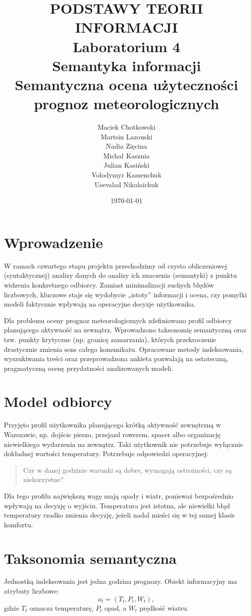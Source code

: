 \documentclass[a4paper,12pt]{article}
\title{
    \vspace{1.5cm}
    \textbf{PODSTAWY TEORII INFORMACJI}\\
    \vspace{1.5cm}
    Laboratorium 4\\
    Semantyka informacji\\
    \vspace{1.5cm}
    \huge \textbf{Semantyczna ocena użyteczności prognoz meteorologicznych}\\
    \vspace{1cm}
}
\author{
    Maciek Chotkowski \\ Martsin Lazouski \\ Nadia Zięcina \\
    Michał Kasznia \\ Julian Kasiński \\ Volodymyr Kamenchuk \\ Usevalad Nikalaichuk
}
\date{\today}
\begin{document}
\maketitle
\newpage

\tableofcontents
\newpage
\section{Wprowadzenie}

W ramach czwartego etapu projektu przechodzimy od czysto obliczeniowej (syntaktycznej) analizy danych do analizy ich znaczenia (semantyki) z punktu widzenia konkretnego odbiorcy. Zamiast minimalizacji suchych błędów liczbowych, kluczowe staje się wydobycie „istoty” informacji i ocena, czy pomyłki modeli faktycznie wpływają na operacyjne decyzje użytkownika.

Dla problemu oceny prognoz meteorologicznych zdefiniowano profil odbiorcy planującego aktywność na zewnątrz. Wprowadzono taksonomię semantyczną oraz tzw. punkty krytyczne (np. granicę zamarzania), których przekroczenie drastycznie zmienia sens całego komunikatu. Opracowane metody indeksowania, wyszukiwania treści oraz przeprowadzona ankieta pozwalają na ostateczną, pragmatyczną ocenę przydatności analizowanych modeli.

\section{Model odbiorcy}

Przyjęto profil użytkownika planującego krótką aktywność zewnętrzną w Warszawie,
np. dojście pieszo, przejazd rowerem, spacer albo organizację niewielkiego
wydarzenia na zewnątrz. Taki użytkownik nie potrzebuje wyłącznie dokładnej
wartości temperatury. Potrzebuje odpowiedzi operacyjnej:
\begin{quote}
Czy w danej godzinie warunki są dobre, wymagają ostrożności, czy są
niekorzystne?
\end{quote}

Dla tego profilu największą wagę mają opady i wiatr, ponieważ bezpośrednio
wpływają na decyzję o wyjściu. Temperatura jest istotna, ale niewielki błąd
temperatury rzadko zmienia decyzję, jeżeli nadal mieści się w tej samej klasie
komfortu.

\section{Taksonomia semantyczna}

Jednostką indeksowania jest jedna godzina prognozy. Obiekt informacyjny ma
atrybuty liczbowe:
\[
    o_t = (T_t, P_t, W_t),
\]
gdzie \(T_t\) oznacza temperaturę, \(P_t\) opad, a \(W_t\) prędkość wiatru.
\end{document}
